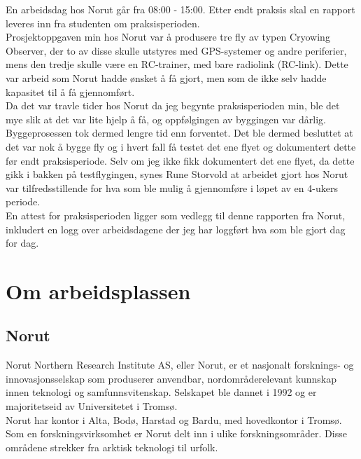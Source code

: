 \documentclass[12pt, a4paper]{article}
\begin{document}
En arbeidsdag hos Norut går fra 08:00 - 15:00. Etter endt praksis skal en rapport leveres inn fra studenten om praksisperioden.\\
Prosjektoppgaven min hos Norut var å produsere tre fly av typen Cryowing Observer, der to av disse skulle utstyres med GPS-systemer og andre periferier, mens den tredje skulle være en RC-trainer, med bare radiolink (RC-link). Dette var arbeid som Norut hadde ønsket å få gjort, men som de ikke selv hadde kapasitet til å få gjennomført.\\ 


Da det var travle tider hos Norut da jeg begynte praksisperioden min, ble det mye slik at det var lite hjelp å få, og oppfølgingen av byggingen var dårlig. Byggeprosessen tok dermed lengre tid enn forventet. Det ble dermed besluttet at det var nok å bygge fly og i hvert fall få testet det ene flyet og dokumentert dette før endt praksisperiode. Selv om jeg ikke fikk dokumentert det ene flyet, da dette gikk i bakken på testflygingen, synes Rune Storvold at arbeidet gjort hos Norut var tilfredsstillende for hva som ble mulig å gjennomføre i løpet av en 4-ukers periode.\\


En attest for praksisperioden ligger som vedlegg til denne rapporten fra Norut, inkludert en logg over arbeidsdagene der jeg har loggført hva som ble gjort dag for dag.


\newpage
\section{Om arbeidsplassen}
\subsection{Norut}
Norut Northern Research Institute AS, eller Norut, er et nasjonalt forsknings- og innovasjonsselskap som produserer anvendbar, nordområderelevant kunnskap innen teknologi og samfunnsvitenskap. Selskapet ble dannet i 1992 og er majoritetseid av Universitetet i Tromsø. \\

Norut har kontor i Alta, Bodø, Harstad og Bardu, med hovedkontor i Tromsø. \\

Som en forskningsvirksomhet er Norut delt inn i ulike forskningsområder. Disse områdene strekker fra arktisk teknologi til urfolk.
\end{document}
